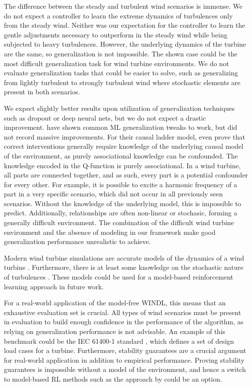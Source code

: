 The difference between the steady and turbulent wind scenarios is immense. We do not expect a controller to learn the extreme dynamics of turbulences only from the steady wind. Neither was our expectation for the controller to learn the gentle adjustments necessary to outperform in the steady wind while being subjected to heavy turbulences. However, the underlying dynamics of the turbine are the same, so generalization is not impossible. The shown case could be the most difficult generalization task for wind turbine environments. We do not evaluate generalization tasks that could be easier to solve, such as generalizing from lightly turbulent to strongly turbulent wind where stochastic elements are present in both scenarios.

We expect slightly better results upon utilization of generalization techniques such as dropout or deep neural nets, but we do not expect a drastic improvement. \citet{cobbeQuantifyingGeneralizationReinforcement2019} have shown common ML generalization tweaks to work, but did not record massive improvements. For their causal ladder model, \citet{pearlCausalInferenceStatistics2009} even prove that correct interventions generally require knowledge of the underlying causal model of the environment, as purely associational knowledge can be confounded. The knowledge encoded in the Q-function is purely associational. In a wind turbine, all parts are connected together, and as such, every part is a potential confounder for every other. For example, it is possible to excite a harmonic frequency of a part in a very specific scenario, which did not occur in all previously seen scenarios. Without the knowledge of the underlying model, this is impossible to predict. Additionally, relationships are often non-linear or stochasic, forming a generally difficult environment. The combination of the difficult wind turbine environment and the absence of modeling in our framework make good generalization performance unrealistic to achieve.

Modern wind turbine simulations are accurate models of the dynamics of a wind turbine \cite{martenQBladeModernTool2020}. Furthermore, there is at least some knowledge on the stochastic nature of turbulences \cite[Chapter 2.6.1]{burtonWindEnergyHandbook2011}. These models could be used for a model-based reinforcement learning approach in future work.

For a real-world application of the model-free WINDL, this means that an exhaustive evaluation set is crucial. All types of wind scenarios must be present in evaluation to build enough confidence in the performance of the algorithm, as relying on generalization performance is not advisable. An example of this benchmark could be the IEC 61400-1 standard \cite{internationalelectrotechnicalcommissionIEC61400120192019}, which defines a set of design load cases for a turbine. Furthermore, stability guarantees are a crucial argument for real-world application in addition to empirical performance. Proving stability guarantees is impossible without a model of the environment, and hence a switch to model-based RL methods such as the approach by \cite{berkenkampSafeModelbasedReinforcement2017} could be an option.

